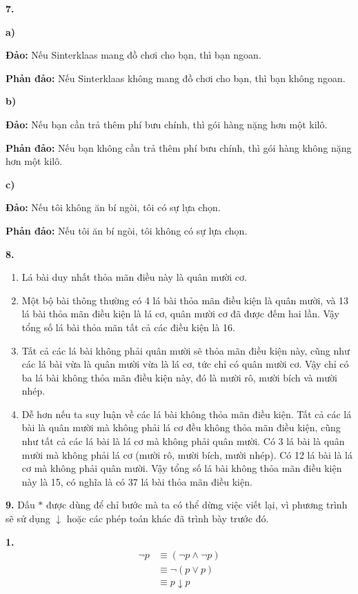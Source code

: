\documentclass[12pt,a4paper]{article}
\theoremstyle{definition}
\begin{document}
\bigskip
\textbf{7.}

\textbf{a)}

\textbf{Đảo:} Nếu Sinterklaas mang đồ chơi cho bạn, thì bạn ngoan.

\textbf{Phản đảo:} Nếu Sinterklaas không mang đồ chơi cho bạn, thì bạn không ngoan.

\textbf{b)}

\textbf{Đảo:} Nếu bạn cần trả thêm phí bưu chính, thì gói hàng nặng hơn một kilô.

\textbf{Phản đảo:} Nếu bạn không cần trả thêm phí bưu chính, thì gói hàng không nặng hơn một kilô.

\textbf{c)}

\textbf{Đảo:} Nếu tôi không ăn bí ngòi, tôi có sự lựa chọn.

\textbf{Phản đảo:} Nếu tôi ăn bí ngòi, tôi không có sự lựa chọn.

\bigskip
\textbf{8.}
\begin{enumerate}[label=\textbf{\alph*)}]
\item Lá bài duy nhất thỏa mãn điều này là quân mười cơ.
\item Một bộ bài thông thường có 4 lá bài thỏa mãn điều kiện là quân mười, và 13 lá bài thỏa mãn điều kiện là lá cơ, quân mười cơ đã được đếm hai lần. Vậy tổng số lá bài thỏa mãn tất cả các điều kiện là 16.
\item Tất cả các lá bài không phải quân mười sẽ thỏa mãn điều kiện này, cũng như các lá bài vừa là quân mười vừa là lá cơ, tức chỉ có quân mười cơ. Vậy chỉ có ba lá bài không thỏa mãn điều kiện này, đó là mười rô, mười bích và mười nhép.
\item Dễ hơn nếu ta suy luận về các lá bài không thỏa mãn điều kiện. Tất cả các lá bài là quân mười mà không phải lá cơ đều không thỏa mãn điều kiện, cũng như tất cả các lá bài là lá cơ mà không phải quân mười. Có 3 lá bài là quân mười mà không phải lá cơ (mười rô, mười bích, mười nhép). Có 12 lá bài là lá cơ mà không phải quân mười. Vậy tổng số lá bài không thỏa mãn điều kiện này là 15, có nghĩa là có 37 lá bài thỏa mãn điều kiện.
\end{enumerate}

\bigskip
\textbf{9.} Dấu $*$ được dùng để chỉ bước mà ta có thể dừng việc viết lại, vì phương trình sẽ sử dụng $\downarrow$ hoặc các phép toán khác đã trình bày trước đó.

\textbf{1.}
\begin{align*}
\neg p &\equiv (\neg p \land \neg p) \\
&\equiv \neg(p \lor p) \\
&\equiv p \downarrow p
\end{align*}
\end{document}
